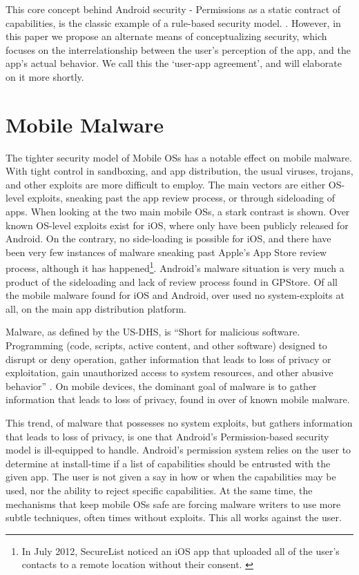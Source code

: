 This core concept behind Android security - Permissions as a static contract of capabilities, is the classic example of a rule-based security model. . However, in this paper we propose an alternate means of conceptualizing security, which focuses on the interrelationship between the user's perception of the app, and the app's actual behavior. We call this the ‘user-app agreement', and will elaborate on it more shortly. 

\section{Mobile Malware}
The tighter security model of Mobile OSs has a notable effect on mobile malware. With tight control in sandboxing, and app distribution, the usual viruses, trojans, and other exploits are more difficult to employ. The main vectors are either OS-level exploits, sneaking past the app review process, or through sideloading of apps. When looking at the two main mobile OSs, a stark contrast is shown. Over  known OS-level exploits exist for iOS, where only  have been publicly released for Android. On the contrary, no side-loading is possible for iOS, and there have been very few instances of malware sneaking past Apple's App Store review process, although it has happened\footnote{In July 2012, SecureList noticed an iOS app that uploaded all of the user's contacts to a remote location without their consent. \citep{SecureList2012}}. Android's malware situation is very much a product of the sideloading and lack of review process found in GPStore. Of all the mobile malware found for iOS and Android, over  used no system-exploits at all,  on the main app distribution platform.

Malware, as defined by the US-DHS, is ``Short for malicious software. Programming (code, scripts, active content, and other software) designed to disrupt or deny operation, gather information that leads to loss of privacy or exploitation, gain unauthorized access to system resources, and other abusive behavior'' \citep{nash2005undirected}. On mobile devices, the dominant goal of malware is to gather information that leads to loss of privacy, found in over  of known mobile malware. 

This trend, of malware that possesses no system exploits, but gathers information that leads to loss of privacy, is one that Android's Permission-based security model is ill-equipped to handle. Android's permission system relies on the user to determine at install-time if a list of capabilities should be entrusted with the given app. The user is not given a say in how or when the capabilities may be used, nor the ability to reject specific capabilities. At the same time, the mechanisms that keep mobile OSs safe are forcing malware writers to use more subtle techniques, often times without exploits. This all works against the user.

